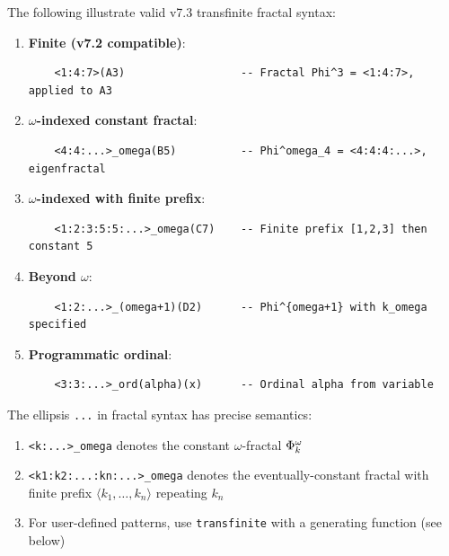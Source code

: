\begin{example}
\label{ex:transfinite-fractal-syntax}
The following illustrate valid v7.3 transfinite fractal syntax:
\begin{enumerate}
  \item \textbf{Finite (v7.2 compatible)}:
  \begin{verbatim}
    <1:4:7>(A3)                  -- Fractal Phi^3 = <1:4:7>, applied to A3
  \end{verbatim}

  \item \textbf{$\omega$-indexed constant fractal}:
  \begin{verbatim}
    <4:4:...>_omega(B5)          -- Phi^omega_4 = <4:4:4:...>, eigenfractal
  \end{verbatim}

  \item \textbf{$\omega$-indexed with finite prefix}:
  \begin{verbatim}
    <1:2:3:5:5:...>_omega(C7)    -- Finite prefix [1,2,3] then constant 5
  \end{verbatim}

  \item \textbf{Beyond $\omega$}:
  \begin{verbatim}
    <1:2:...>_(omega+1)(D2)      -- Phi^{omega+1} with k_omega specified
  \end{verbatim}

  \item \textbf{Programmatic ordinal}:
  \begin{verbatim}
    <3:3:...>_ord(alpha)(x)      -- Ordinal alpha from variable
  \end{verbatim}
\end{enumerate}
\end{example}

\begin{definition}
\label{def:ellipsis-interp}
The ellipsis \texttt{...} in fractal syntax has precise semantics:
\begin{enumerate}
  \item \texttt{<k:...>\_omega} denotes the constant $\omega$-fractal $\Phi^{\omega}_k$
  \item \texttt{<k1:k2:...:kn:...>\_omega} denotes the eventually-constant fractal with finite prefix $\langle k_1, \ldots, k_n \rangle$ repeating $k_n$
  \item For user-defined patterns, use \texttt{transfinite} with a generating function (see below)
\end{enumerate}
\end{definition}

